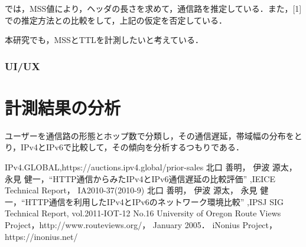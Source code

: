 \documentclass[rinkou,a4paper]{ieicej}
\begin{document}
\cite{kitaguchi2}では，MSS値により，ヘッダの長さを求めて，通信路を推定している．また，[1]での推定方法との比較をして，上記の仮定を否定している．

本研究でも，MSSとTTLを計測したいと考えている．

\subsubsection{UI/UX}

\section{計測結果の分析}
ユーザーを通信路の形態とホップ数で分類し，その通信遅延，帯域幅の分布をとり，IPv4とIPv6で比較して，その傾向を分析するつもりである．

\begin{thebibliography}{9} %
IPv4.GLOBAL,https://auctions.ipv4.global/prior-sales
 北口 善明， 伊波 源太， 永見 健一，``HTTP通信からみたIPv4とIPv6通信遅延の比較評価'' ,IEICE Technical Report， IA2010-37(2010-9)
 北口 善明， 伊波 源太， 永見 健一，``HTTP通信を利用したIPv4とIPv6のネットワーク環境比較'' ,IPSJ SIG Technical Report, vol.2011-IOT-12 No.16
University of Oregon Route Views Project，http://www.routeviews.org/， January 2005．
iNonius Project，https://inonius.net/

\end{thebibliography}
\end{document}
